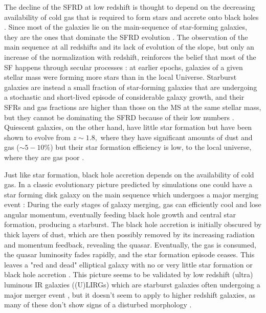     The decline of the SFRD at low redshift is thought to depend on the decreasing availability of cold gas that is required to form stars and accrete onto black holes \citep[e.g.,][]{2016MNRAS.458L..14F}. Since most of the galaxies lie on the main-sequence of star-forming galaxies, they are the ones that dominate the SFRD evolution \citep{2011ApJ...739L..40R}. The observation of the main sequence at all redshifts and its lack of evolution of the slope, but only an increase of the normalization with redshift, reinforces the belief that most of the SF happens through secular processes \citep{2015A&A...581A..54T, 2015A&A...575A..74S, 2016ApJ...817..118T}: at earlier epochs, galaxies of a given stellar mass were forming more stars than in the local Universe.
    Starburst galaxies are instead a small fraction of star-forming galaxies that are undergoing a stochastic and short-lived episode of considerable galaxy growth, and their SFRs and gas fractions are higher than those on the MS at the same stellar mass, but they cannot be dominating the SFRD because of their low numbers \citep[$\sim2\%$][]{2011ApJ...739L..40R}. 
    Quiescent galaxies, on the other hand, have little star formation but have been shown to evolve from $z\sim1.8,$ where they have significant amounts of dust and gas ($\sim5-10\%$) but their star formation efficiency is low, to the local universe, where they are gas poor \citep{2018NatAs...2..239G}.
    
    Just like star formation, black hole accretion depends on the availability of cold gas. 
    In a classic evolutionary picture predicted by simulations one could have a star forming disk galaxy on the main sequence which undergoes a major merging event \citep{2005Natur.433..604D, 2008ApJS..175..356H}: During the early stages of galaxy merging, gas can efficiently cool and lose angular momentum, eventually feeding black hole growth and central star formation, producing a starburst. The black hole accretion is initially obscured by thick layers of dust, which are then possibly removed by its increasing radiation and momentum feedback, revealing the quasar. Eventually, the gas is consumed, the quasar luminosity fades rapidly, and the star formation episode ceases. This leaves a "red and dead" elliptical galaxy with no or very little star formation or black hole accretion \citep{2004ApJ...600..580G, 2006ApJ...650...42L}. This picture seems to be validated by low redshift (ultra) luminous IR galaxies ((U)LIRGs) which are starburst galaxies often undergoing a major merger event \citep{1996ARA&A..34..749S}, but it doesn't seem to apply to higher redshift galaxies, as many of these don't show signs of a disturbed morphology \citep{2007A&A...468...33E, 2019ApJ...877L..38R}. 
    
